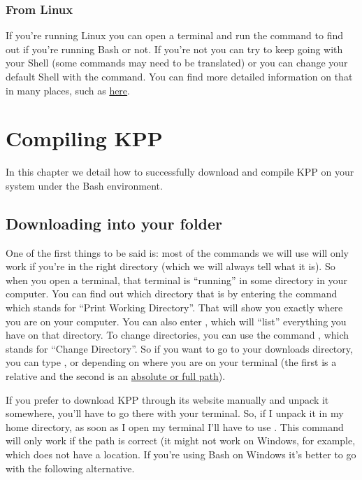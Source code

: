 \documentclass[letterpaper,10pt,openany,oneside]{sphinxmanual}
\begin{document}
\subsection{From Linux}
\label{bash:from-linux}
If you're running Linux you can open a terminal and run the command  to find out if you're running Bash or not. If you're not you can try to
keep going with your Shell (some commands may need to be translated) or you can
change your default Shell with the  command. You can find more detailed
information on that in many places, such as \href{http://stackoverflow.com/questions/13046192/changing-default-shell-in-linux}{here}.


\chapter{Compiling KPP}
\label{compiling::doc}\label{compiling:compiling-kpp}
In this chapter we detail how to successfully download and compile KPP
on your system under the Bash environment.


\section{Downloading into your folder}
\label{compiling:downloading-into-your-folder}
One of the first things to be said is: most of the commands we will use will
only work if you're in the right directory (which we will always tell what it
is). So when you open a terminal, that terminal is ``running'' in some directory
in your computer.  You can find out which directory that is by entering the
command  which stands for ``Print Working Directory''. That will show you
exactly where you are on your computer. You can also enter , which will
``list'' everything you have on that directory. To change directories, you can
use the command , which stands for ``Change Directory''. So if you want to go
to your downloads directory, you can type , or  depending on where you are on your terminal (the first is
a relative and the second is an \href{https://jeremywsherman.com/blog/2011/09/26/absolute-and-relative-paths/}{absolute or full path}).

If you prefer to download KPP through its website manually and unpack it
somewhere, you'll have to go there with your terminal. So, if I unpack it in my
home directory, as soon as I open my terminal I'll have to use . This command will only work if the path is correct (it
might not work on Windows, for example, which does not have a  location.
If you're using Bash on Windows it's better to go with the following
alternative.
\end{document}
